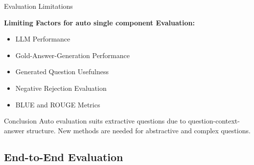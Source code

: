 \documentclass{beamer}
\begin{document}
\begin{frame}{Evaluation Limitations}

  \textbf{Limiting Factors for auto single component Evaluation:}
  \begin{itemize}
    \item LLM Performance
    \item Gold-Answer-Generation Performance
    \item Generated Question Usefulness
    \item Negative Rejection Evaluation
    \item BLUE and ROUGE Metrics
  \end{itemize}

  \bigskip

  \begin{block}{Conclusion}
    Auto evaluation suits extractive questions due to question-context-answer structure. New methods are needed for abstractive and complex questions.
  \end{block}
    
\end{frame}

\subsection{End-to-End Evaluation}
\end{document}
